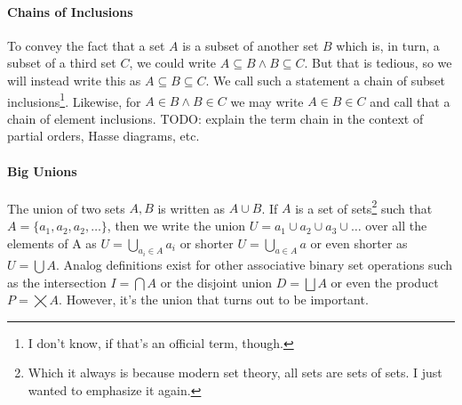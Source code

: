 \paragraph{Chains of Inclusions}
To convey the fact that a set $A$ is a subset of another set $B$ which is, in turn, a subset of a third set $C$, we could write $A \subseteq B \wedge B \subseteq C$. But that is tedious, so we will instead write this as $A \subseteq B \subseteq C$. We call such a statement a chain of subset inclusions\footnote{I don't know, if that's an official term, though.}. Likewise, for $A \in B \wedge B \in C$ we may write $A \in B \in C$ and call that a chain of element inclusions. TODO: explain the term chain in the context of partial orders, Hasse diagrams, etc.




\paragraph{Big Unions}
The union of two sets $A,B$ is written as $A \cup B$. If $A$ is a set of sets\footnote{Which it always is because modern set theory, all sets are sets of sets. I just wanted to emphasize it again.} such that $A = \{a_1, a_2, a_2, \ldots \}$, then we write the union $U = a_1 \cup a_2 \cup a_3 \cup \ldots$ over all the elements of A as $U = \bigcup_{a_i \in A} a_i$ or shorter $U = \bigcup_{a \in A} a$ or even shorter as $U = \bigcup A$. Analog definitions exist for other associative binary set operations such as the intersection $I = \bigcap A$ or the disjoint union $D = \bigsqcup A$ or even the product $P = \bigtimes A$. However, it's the union that turns out to be important. 



